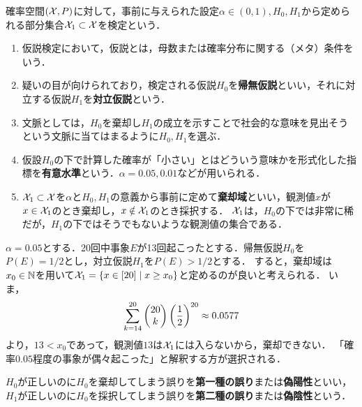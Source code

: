 \documentclass[uplatex,dvipdfmx]{jsreport}
\begin{document}
\begin{definition}
    確率空間$(\mathcal{X},P)$に対して，事前に与えられた設定$\alpha\in(0,1),H_0,H_1$から定められる部分集合$\mathcal{X}_1\subset\mathcal{X}$を検定という．
    \begin{enumerate}
        \item 仮説検定において，仮説とは，母数または確率分布に関する（メタ）条件をいう．
        \item 疑いの目が向けられており，検定される仮説$H_0$を\textbf{帰無仮説}といい，それに対立する仮説$H_1$を\textbf{対立仮説}という．
        \item 文脈としては，$H_0$を棄却し$H_1$の成立を示すことで社会的な意味を見出そうという文脈に当てはまるように$H_0,H_1$を選ぶ．
        \item 仮設$H_0$の下で計算した確率が「小さい」とはどういう意味かを形式化した指標を\textbf{有意水準}という．$\alpha=0.05,0.01$などが用いられる．
        \item $\mathcal{X}_1\subset\mathcal{X}$を$\alpha$と$H_0,H_1$の意義から事前に定めて\textbf{棄却域}といい，観測値$x$が$x\in\mathcal{X}_1$のとき棄却し，$x\notin\mathcal{X}_1$のとき採択する．
        $\mathcal{X}_1$は，$H_0$の下では非常に稀だが，$H_1$の下ではそうでもないような観測値の集合である．
    \end{enumerate}
\end{definition}

\begin{example}\label{exp-hypothesis-testing}
    $\alpha=0.05$とする．20回中事象$E$が13回起こったとする．帰無仮説$H_0$を$P(E)=1/2$とし，対立仮説$H_1$を$P(E)>1/2$とする．
    すると，棄却域は$x_0\in\mathbb{N}$を用いて$\mathcal{X}_1=\left\{x\in[20]\mid x\ge x_0\right\}$と定めるのが良いと考えられる．
    いま，
    \[\sum^{20}_{k=14}\begin{pmatrix}20\\k\end{pmatrix}\left(\frac{1}{2}\right)^{20}\approx 0.0577\]
    より，$13<x_0$であって，観測値$13$は$\mathcal{X}_1$には入らないから，棄却できない．
    「確率$0.05$程度の事象が偶々起こった」と解釈する方が選択される．
\end{example}

\begin{definition}
    $H_0$が正しいのに$H_0$を棄却してしまう誤りを\textbf{第一種の誤り}または\textbf{偽陽性}といい，$H_1$が正しいのに$H_0$を採択してしまう誤りを\textbf{第二種の誤り}または\textbf{偽陰性}という．
\end{definition}
\end{document}
